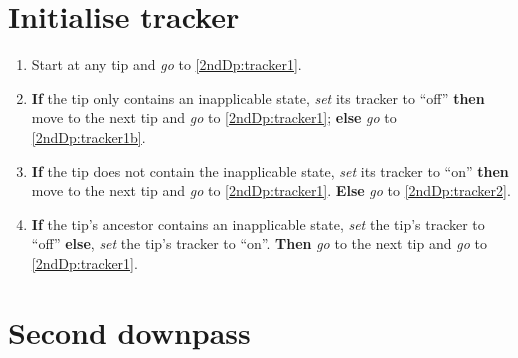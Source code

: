 \documentclass[a4paper,12pt]{article}
\begin{document}
\section{Initialise tracker}

\begin{enumerate}
    \item \label{2ndDp:tracker} Start at any tip and \textit{go} to \ref{2ndDp:tracker1}.
    \item \label{2ndDp:tracker1} \textbf{If} the tip only contains an inapplicable state, \textit{set} its tracker to ``off'' \textbf{then} move to the next tip and \textit{go} to \ref{2ndDp:tracker1}; \textbf{else} \textit{go} to \ref{2ndDp:tracker1b}.
    \item \label{2ndDp:tracker1b} \textbf{If} the tip does not contain the inapplicable state, \textit{set} its tracker to ``on'' \textbf{then} move to the next tip and \textit{go} to \ref{2ndDp:tracker1}. \textbf{Else} \textit{go} to \ref{2ndDp:tracker2}.
    \item \label{2ndDp:tracker2} \textbf{If} the tip's ancestor contains an inapplicable state, \textit{set} the tip's tracker to ``off'' \textbf{else}, \textit{set} the tip's tracker to ``on''. \textbf{Then} \textit{go} to the next tip and \textit{go} to \ref{2ndDp:tracker1}.
\end{enumerate}

\section{Second downpass} \label{2ndDp}
\end{document}
